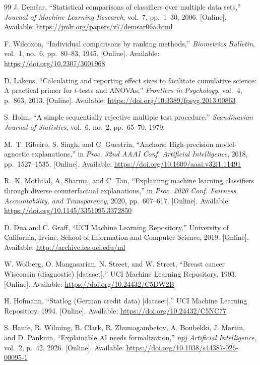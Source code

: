 \documentclass{cleiej}
\begin{document}
\begin{thebibliography}{99}
J. Dem\v{s}ar, ``Statistical comparisons of classifiers over multiple data
sets,'' \emph{Journal of Machine Learning Research}, vol.~7, pp.~1--30,
2006. [Online]. Available:
\url{https://jmlr.org/papers/v7/demsar06a.html}

F. Wilcoxon, ``Individual comparisons by ranking methods,''
\emph{Biometrics Bulletin}, vol.~1, no.~6, pp.~80--83, 1945. [Online]. Available:
\url{https://doi.org/10.2307/3001968}

D. Lakens, ``Calculating and reporting effect sizes to facilitate
cumulative science: A practical primer for $t$-tests and ANOVAs,''
\emph{Frontiers in Psychology}, vol.~4, p.~863, 2013. [Online]. Available:
\url{https://doi.org/10.3389/fpsyg.2013.00863}

S. Holm, ``A simple sequentially rejective multiple test procedure,''
\emph{Scandinavian Journal of Statistics}, vol.~6, no.~2, pp.~65--70, 1979.

M.~T. Ribeiro, S. Singh, and C. Guestrin, ``Anchors: High-precision
model-agnostic explanations,'' in \emph{Proc. 32nd AAAI Conf. Artificial
Intelligence}, 2018, pp.~1527--1535. [Online]. Available:
\url{https://doi.org/10.1609/aaai.v32i1.11491}

R.~K. Mothilal, A. Sharma, and C. Tan, ``Explaining machine learning
classifiers through diverse counterfactual explanations,'' in \emph{Proc.
2020 Conf. Fairness, Accountability, and Transparency}, 2020, pp.~607--617. [Online]. Available:
\url{https://doi.org/10.1145/3351095.3372850}

D. Dua and C. Graff, ``UCI Machine Learning Repository,'' University of
California, Irvine, School of Information and Computer Science, 2019.
[Online]. Available: \url{http://archive.ics.uci.edu/ml}

W. Wolberg, O. Mangasarian, N. Street, and W. Street, ``Breast cancer
Wisconsin (diagnostic) [dataset],'' UCI Machine Learning Repository, 1993.
[Online]. Available: \url{https://doi.org/10.24432/C5DW2B}

H. Hofmann, ``Statlog (German credit data) [dataset],'' UCI Machine
Learning Repository, 1994. [Online]. Available:
\url{https://doi.org/10.24432/C5NC77}

S. Haufe, R. Wilming, B. Clark, R. Zhumagambetov, A. Boubekki, J. Martin,
and D. Panknin, ``Explainable AI needs formalization,'' \emph{npj
Artificial Intelligence}, vol.~2, p.~42, 2026. [Online]. Available:
\url{https://doi.org/10.1038/s44387-026-00095-1}


\end{thebibliography}
\end{document}
